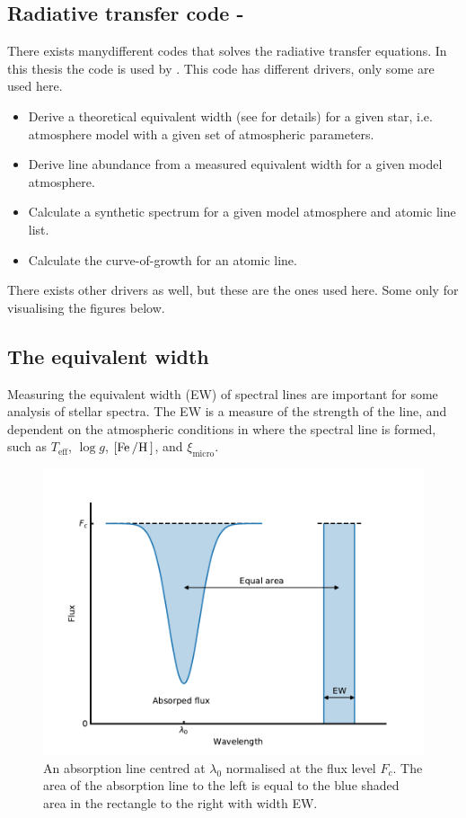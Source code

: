 \subsection{Radiative transfer code - }

There exists manydifferent codes that solves the radiative transfer equations. In this thesis the
 code is used by \citet{Sneden1973}. This code has different drivers, only some are used
here.
\begin{itemize}
  \item Derive a theoretical equivalent width (see  for details) for a given star, i.e.
        atmosphere model with a given set of atmospheric parameters.
  \item Derive line abundance from a measured equivalent width for a given model atmosphere.
  \item Calculate a synthetic spectrum for a given model atmosphere and atomic line list.
  \item Calculate the curve-of-growth for an atomic line.
\end{itemize}
There exists other drivers as well, but these are the ones used here. Some only for visualising the
figures below.



\subsection{The equivalent width}
\label{sec:EW}

Measuring the equivalent width (EW) of spectral lines are important for some analysis of stellar
spectra. The EW is a measure of the strength of the line, and dependent on the atmospheric
conditions in where the spectral line is formed, such as $T_\mathrm{eff}$, $\log g$,
$[\ion{Fe}/\ion{H}]$, and $\xi_\mathrm{micro}$.

\begin{figure}[htpb!]
    \centering
    \includegraphics[width=0.85\linewidth]{figures/ewTheoretical.pdf}
    \caption{An absorption line centred at $\lambda_0$ normalised at the flux level $F_c$. The area
             of the absorption line to the left is equal to the blue shaded area in the rectangle to
             the right with width EW.}
    \label{fig:ewTheoretical}
\end{figure}

